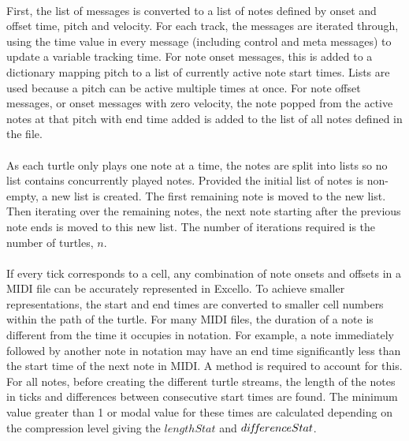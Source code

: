 \paragraph{} First, the list of messages is converted to a list of notes defined by onset and offset time, pitch and velocity. For each track, the messages are iterated through, using the time value in every message (including control and meta messages) to update a variable tracking time. For note onset messages, this is added to a dictionary mapping pitch to a list of currently active note start times. Lists are used because a pitch can be active multiple times at once. For note offset messages, or onset messages with zero velocity, the note popped from the active notes at that pitch with end time added is added to the list of all notes defined in the file.

\paragraph{} As each turtle only plays one note at a time, the notes are split into lists so no list contains concurrently played notes. Provided the initial list of notes is non-empty, a new list is created. The first remaining note is moved to the new list. Then iterating over the remaining notes, the next note starting after the previous note ends is moved to this new list. The number of iterations required is the number of turtles, $n$.

\paragraph{} If every tick corresponds to a cell, any combination of note onsets and offsets in a MIDI file can be accurately represented in Excello. To achieve smaller representations, the start and end times are converted to smaller cell numbers within the path of the turtle. For many MIDI files, the duration of a note is different from the time it occupies in notation. For example, a note immediately followed by another note in notation may have an end time significantly less than the start time of the next note in MIDI. A method is required to account for this. For all notes, before creating the different turtle streams, the length of the notes in ticks and differences between consecutive start times are found. The minimum value greater than 1 or modal value for these times are calculated depending on the compression level giving the $lengthStat$ and $di\hspace{-0.1em}f\hspace{-0.2em}f\hspace{-0.1em}erenceStat$.
\vspace{-10pt}


